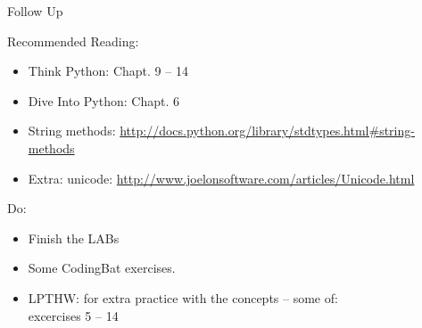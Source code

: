 \documentclass{beamer}
\begin{document}
\begin{frame}[fragile]{Follow Up}

{\Large Recommended Reading:}
\begin{itemize}
  \item Think Python: Chapt. 9 -- 14
  \item Dive Into Python: Chapt. 6
  \item String methods: \url{http://docs.python.org/library/stdtypes.html#string-methods}
  \item Extra: unicode: \url{http://www.joelonsoftware.com/articles/Unicode.html}
\end{itemize}

\vfill
{\Large Do:}
\begin{itemize}
    \item Finish the LABs
    \item Some CodingBat exercises. 
    \item LPTHW: for extra practice with the concepts -- some of:\\
          excercises 5 -- 14
\end{itemize}

\end{frame}
\end{document}
